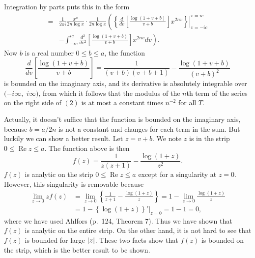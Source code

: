 \documentclass{note}
\numberwithin{equation}{chapter}
\newcommand{\re}{\operatorname{Re}}
\begin{document}
\begin{quotebar}
    Integration by parts puts this in the form
    \begin{align*}
        = & \frac{1}{2\pi i} \frac{x^a}{2n \log x} \cdot \frac{1}{2n \log x}
        \left( \left.\left\{ \frac{d}{dv} \left[ \frac{\log(1 + v + b)}{v + b}
        \right] x^{2nv} \right\}\right|_{v = -ic}^{v = ic} \right.           \\
          & \left. - \int_{-ic}^{ic} \frac{d^2}{dv^2} \left[
            \frac{\log(1 + v + b)}{v + b} \right] x^{2nv} dv \right).
    \end{align*}
    Now $b$ is a real number $0 \leq b \leq a$, the function
    \begin{equation*}
        \frac{d}{dv} \left[ \frac{\log(1 + v + b)}{v + b} \right] = \frac{1}{(v + b)(v
            + b + 1)} - \frac{\log(1 + v + b)}{(v + b)^2}
    \end{equation*}
    is bounded on the imaginary axis, and its derivative is absolutely integrable
    over $(-i\infty,$ $i\infty)$, from which it follows that the modulus of the
    $n$th term of the series on the right side of $(2)$ is at most a constant times
    $n^{-2}$ for all $T$.
\end{quotebar}

Actually, it doesn't suffice that the function is bounded on the imaginary
axis, because $b = a/2n$ is not a constant and changes for each term in the
sum. But luckily we can show a better result. Let $z = v + b$. We note $z$ is
in the strip $0 \leq \re z \le a$. The function above is then
\begin{equation*}
    f(z) = \frac{1}{z(z + 1)} - \frac{\log(1 + z)}{z^2}.
\end{equation*}
$f(z)$ is analytic on the strip $0 \leq \re z \le a$ except for a singularity
at $z = 0$. However, this singularity is removable because
\begin{align*}
    \lim_{z \to 0} zf(z)
     & = \lim_{z \to 0} \left\{ \frac{1}{z + 1} - \frac{\log(1 + z)}{z}
    \right\} = 1 - \lim_{z \to 0} \frac{\log(1 + z)}{z}                 \\
     & = 1 - \left\{\log(1+z)\right\}'|_{z = 0} = 1 - 1 = 0,
\end{align*}
where we have used Ahlfors (p.~124, Theorem 7). Thus we have shown that $f(z)$
is analytic on the entire strip. On the other hand, it is not hard to see that
$f(z)$ is bounded for large $\abs{z}$. These two facts show that $f(z)$ is
bounded on the strip, which is the better result to be shown.
\end{document}
